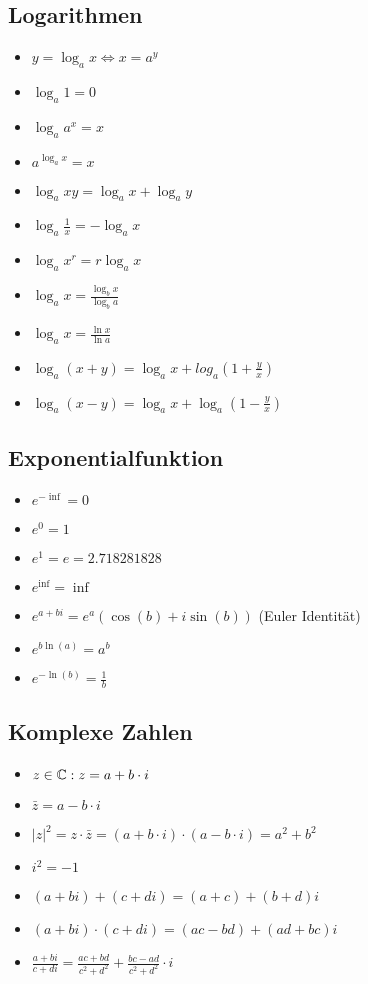 \subsection{Logarithmen}
\begin{itemize}[leftmargin=*]
  \item $y = \log_a x \Leftrightarrow x = a^y$
  \item $\log_a 1 = 0$
  \item $\log_a a^x = x$
  \item $a^{\log_a x} = x $
  \item $\log_a xy = \log_a x + \log_a y$
  \item $\log_a \frac{1}{x} = - \log_a x$
  \item $\log_a x^r = r \log_a x$
  \item $\log_a x = \frac{\log_b x}{\log_b a}$
  \item $\log_a x = \frac{\ln x}{\ln a}$
  \item $\log_a (x+y) = \log_a x + log_a (1 + \frac{y}{x})$
  \item $\log_a (x-y) = \log_a x + \log_a (1- \frac{y}{x})$
\end{itemize}

\subsection{Exponentialfunktion}
\begin{itemize}[leftmargin=*]
  \item $e^{-\inf} = 0$
  \item $e^0 = 1$
  \item $e^1 = e =  2.718281828$
  \item $e^{\inf} = \inf$
  \item $e^{a+bi} = e^a(\cos(b) + i \sin(b))$ (Euler Identität)
  \item $e^{b \ln(a)} = a^b$
  \item $ e^{-\ln(b)} = \frac{1}{b}$ 
\end{itemize}

\subsection{Komplexe Zahlen}
\begin{itemize}[leftmargin=*]
	\item $z \in \mathbb{C}: z = a + b\cdot i$
	\item $\bar{z} = a - b\cdot i$
	\item $|z|^2 = z \cdot \bar{z} = (a + b\cdot i) \cdot (a - b\cdot i) = a^2 + b^2$
	\item $i^2 = -1$
	\item $(a + bi) + (c + di) = (a + c) + (b + d)i$
	\item $(a + bi) \cdot (c + di) = (ac - bd) + (ad + bc)i$
	\item $\frac{a + bi}{c + di} = \frac{ac + bd}{c^2 + d^2} + \frac{bc - ad}{c^2 + d^2}\cdot i$
\end{itemize}
\pagebreak
